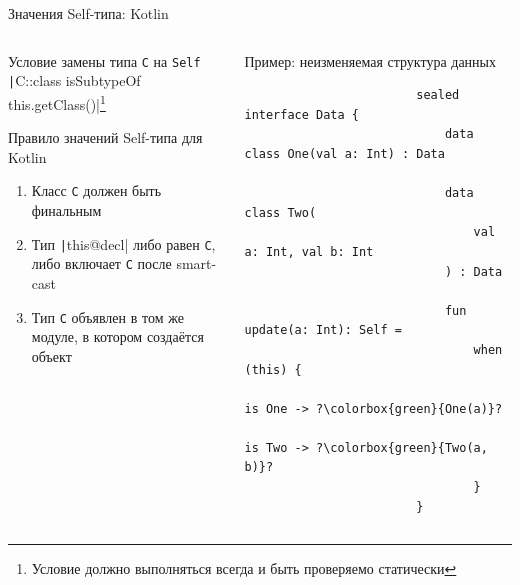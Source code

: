 \documentclass[usenames, dvipsnames]{beamer}
\begin{document}
    \begin{frame}[fragile]{Значения Self-типа: Kotlin}
        \vspace{-1em}
        \begin{columns}[onlytextwidth]
            \begin{column}[t]{0.485\textwidth}
                \begin{block}{Условие замены типа \texttt{C} на \texttt{Self}}
                    \texttt|C::class isSubtypeOf this.getClass()|\footnote{Условие должно выполняться всегда и быть проверяемо статически}
                \end{block}
                \begin{block}{Правило значений Self-типа для Kotlin}
                    \begin{enumerate}
                        \item Класс \texttt{C} должен быть финальным
                        \item Тип \texttt|this@decl|
                        либо равен \texttt{С}, либо включает \texttt{C} после smart-cast
                        \item Тип \texttt{C} объявлен в том же модуле, в котором создаётся объект
                    \end{enumerate}
                \end{block}
            \end{column}\hfill%
            \begin{column}[t]{0.485\textwidth}
                \begin{block}{Пример: неизменяемая структура данных}
                    \begin{verbatim}
                        sealed interface Data {
                            data class One(val a: Int) : Data

                            data class Two(
                                val a: Int, val b: Int
                            ) : Data

                            fun update(a: Int): Self =
                                when (this) {
                                    is One -> ?\colorbox{green}{One(a)}?
                                    is Two -> ?\colorbox{green}{Two(a, b)}?
                                }
                        }
                    \end{verbatim}
                \end{block}
            \end{column}
        \end{columns}
    \end{frame}
\end{document}
